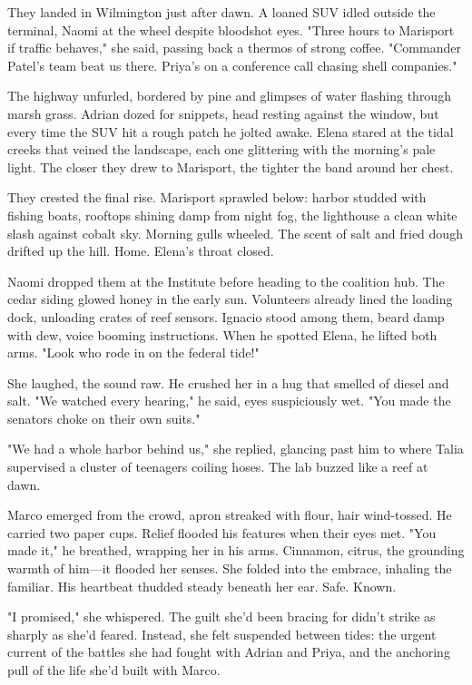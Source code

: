 They landed in Wilmington just after dawn. A loaned SUV idled outside the terminal, Naomi at the wheel despite bloodshot eyes. "Three hours to Marisport if traffic behaves," she said, passing back a thermos of strong coffee. "Commander Patel's team beat us there. Priya's on a conference call chasing shell companies."

The highway unfurled, bordered by pine and glimpses of water flashing through marsh grass. Adrian dozed for snippets, head resting against the window, but every time the SUV hit a rough patch he jolted awake. Elena stared at the tidal creeks that veined the landscape, each one glittering with the morning's pale light. The closer they drew to Marisport, the tighter the band around her chest.

They crested the final rise. Marisport sprawled below: harbor studded with fishing boats, rooftops shining damp from night fog, the lighthouse a clean white slash against cobalt sky. Morning gulls wheeled. The scent of salt and fried dough drifted up the hill. Home. Elena's throat closed.

Naomi dropped them at the Institute before heading to the coalition hub. The cedar siding glowed honey in the early sun. Volunteers already lined the loading dock, unloading crates of reef sensors. Ignacio stood among them, beard damp with dew, voice booming instructions. When he spotted Elena, he lifted both arms. "Look who rode in on the federal tide!"

She laughed, the sound raw. He crushed her in a hug that smelled of diesel and salt. "We watched every hearing," he said, eyes suspiciously wet. "You made the senators choke on their own suits."

"We had a whole harbor behind us," she replied, glancing past him to where Talia supervised a cluster of teenagers coiling hoses. The lab buzzed like a reef at dawn.

Marco emerged from the crowd, apron streaked with flour, hair wind-tossed. He carried two paper cups. Relief flooded his features when their eyes met. "You made it," he breathed, wrapping her in his arms. Cinnamon, citrus, the grounding warmth of him—it flooded her senses. She folded into the embrace, inhaling the familiar. His heartbeat thudded steady beneath her ear. Safe. Known.

"I promised," she whispered. The guilt she'd been bracing for didn't strike as sharply as she'd feared. Instead, she felt suspended between tides: the urgent current of the battles she had fought with Adrian and Priya, and the anchoring pull of the life she'd built with Marco.

